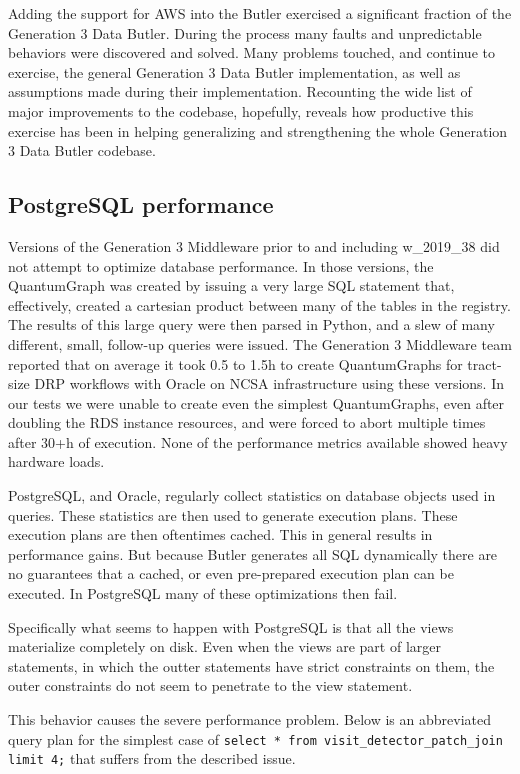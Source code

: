 Adding the support for AWS into the Butler exercised a significant fraction of the Generation 3 Data Butler.
During the process many faults and unpredictable behaviors were discovered and solved.
Many problems touched, and continue to exercise, the general Generation 3 Data Butler implementation, as well as assumptions made during their implementation.
Recounting the wide list of major improvements to the codebase, hopefully, reveals how productive this exercise has been in helping generalizing and strengthening the whole Generation 3 Data Butler codebase.

\subsection{PostgreSQL performance}

Versions of the Generation 3 Middleware prior to and including w\_2019\_38 did not attempt to optimize database performance.
In those versions, the QuantumGraph was created by issuing a very large SQL statement that, effectively, created a cartesian product between many of the tables in the registry.
The results of this large query were then parsed in Python, and a slew of many different, small, follow-up queries were issued.
The Generation 3 Middleware team reported that on average it took 0.5 to 1.5h to create QuantumGraphs for tract-size DRP workflows with Oracle on NCSA infrastructure using these versions.
In our tests we were unable to create even the simplest QuantumGraphs, even after doubling the RDS instance resources, and were forced to abort multiple times after 30+h of execution.
None of the performance metrics available showed heavy hardware loads.

PostgreSQL, and Oracle, regularly collect statistics on database objects used in queries.
These statistics are then used to generate execution plans.
These execution plans are then oftentimes cached.
This in general results in performance gains.
But because Butler generates all SQL dynamically there are no guarantees that a cached, or even pre-prepared execution plan can be executed.
In PostgreSQL many of these optimizations then fail.

Specifically what seems to happen with PostgreSQL is that all the views materialize completely on disk.
Even when the views are part of larger statements, in which the outter statements have strict constraints on them, the outer constraints do not seem to penetrate to the view statement.


This behavior causes the severe performance problem.
Below is an abbreviated query plan for the simplest case of \lstinline[basicstyle=\ttfamily]{select * from visit_detector_patch_join limit 4;} that suffers from the described issue.

